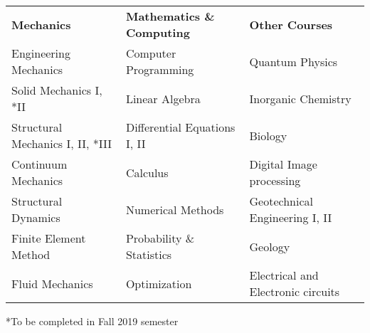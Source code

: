 
\begin{tabular}{p{}p{}p{}}
     \textbf{Mechanics} & \textbf{Mathematics \& Computing} & \textbf{Other Courses} \\
     {Engineering Mechanics} & {Computer Programming} & {Quantum Physics}\\
     {Solid Mechanics I, *II} & {Linear Algebra} & {Inorganic Chemistry}\\
     {Structural Mechanics I, II, *III} & {Differential Equations I, II} & {Biology}\\
     {Continuum Mechanics} & {Calculus} & {Digital Image processing}\\
     {Structural Dynamics} & {Numerical Methods} & {Geotechnical Engineering I, II}\\
     {Finite Element Method} & {Probability \& Statistics} & {Geology}\\
     {Fluid Mechanics} & {Optimization} & {Electrical and Electronic circuits}
\end{tabular}{}

*To be completed in Fall 2019 semester